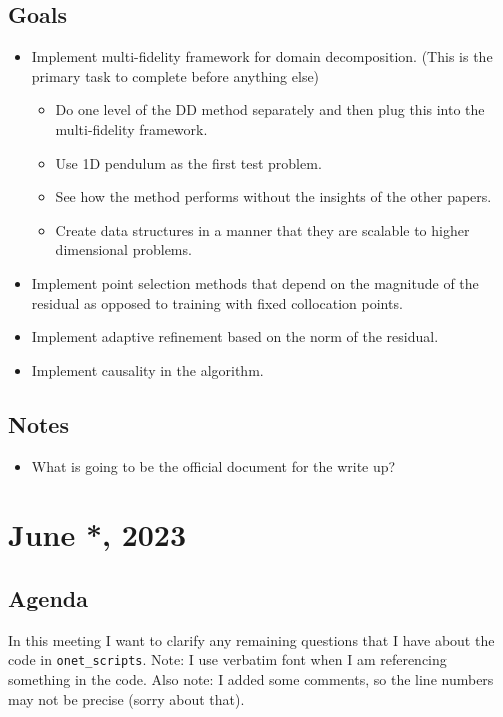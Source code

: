 \documentclass{article}
\begin{document}
\subsection*{Goals}
\begin{itemize}
\item Implement multi-fidelity framework for domain decomposition. (This is the primary task to complete before anything else)
\begin{itemize}
	\item Do one level of the DD method separately and then plug this into the multi-fidelity framework.
	\item Use 1D pendulum as the first test problem.
	\item See how the method performs without the insights of the other papers.
	\item Create data structures in a manner that they are scalable to higher dimensional problems.
\end{itemize}
\item Implement point selection methods that depend on the magnitude of the residual as opposed to training with fixed collocation points.
\item Implement adaptive refinement based on the norm of the residual.
\item Implement causality in the algorithm.
\end{itemize}
\subsection*{Notes}
\begin{itemize}
	\item What is going to be the official document for the write up?
\end{itemize}
\newpage
\section*{June *, 2023}
\subsection*{Agenda}
In this meeting I want to clarify any remaining questions that I have about the code in \verb|onet_scripts|. Note: I use verbatim font when I am referencing something in the code. Also note: I added some comments, so the line numbers may not be precise (sorry about that).
\end{document}
